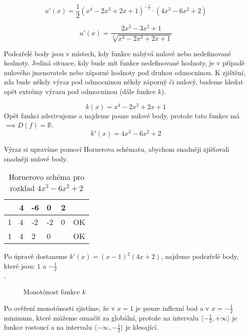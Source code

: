 \begin{displaymath}
u'(x)=\frac{1}{2}(x^4 -2x^3 + 2x + 1)^{-\frac{1}{2}}\cdot(4x^3 - 6x^2 + 2)
\end{displaymath}

\begin{displaymath}
u'(x)=\frac{2x^3 - 3x^2 + 1}{\sqrt[2]{x^4 -2x^3 + 2x + 1}}
\end{displaymath}

Podezřelé body jsou v místech, kdy funkce nabývá nulové nebo nedefinované hodnoty. 
Jediná situace, kdy bude mít funkce nedefinované hodnoty, je v případě nulového jmenovatele nebo záporné hodnoty pod druhou odmocninou.
K zjištění, zda bude někdy výraz pod odmocninou někdy záporný či nulový, budeme hledat opět extrémy výrazu pod odmocninou (dále funkce \(k\)).

\begin{displaymath}
k(x)=x^4 -2x^3 + 2x + 1
\end{displaymath}
Opět funkci zderivujeme a najdeme pouze nulové body, protože tato funkce má \(\implies D(f) = \mathbb{R}\).
\begin{displaymath}
k'(x)=4x^3 -6x^2 + 2
\end{displaymath}

Výraz si upravíme pomocí Hornerova schématu, abychom snadněji zjišťovali snadněji nulové body.
\begin{table}[!h]
\centering
\begin{tabular}{l||l|l|l|l|l}
	 & 4 & -6 &  0 & 2 &    \\ \hline\hline
   1 & 4 & -2 & -2 & 0 & OK \\ \hline
   1 & 4 &  2 &  0 &   & OK \\
\end{tabular}
\caption{Hornerovo schéma pro rozklad $4x^3 - 6x^2 + 2$}
\end{table}

Po úpravě dostaneme \(k'(x)=(x-1)^2(4x + 2)\), najdeme podezřelé body, které jsou: $1$ a $-\frac{1}{2}$\\.

\begin{figure}[H]
	\centering
	
	\caption{Monotónost funkce \(k\)}
\end{figure}

Po ověření monotónosti zjistíme, že v $x=1$ je pouze inflexní bod a v $x=-\frac{1}{2}$ minimum, 
které můžeme označit za globální, protože na intervalu \(\langle-\frac{1}{2},+\infty\rangle\) je funkce rostoucí 
a na intervalu \(\langle-\infty,-\frac{1}{2}\rangle\) je klesající.

